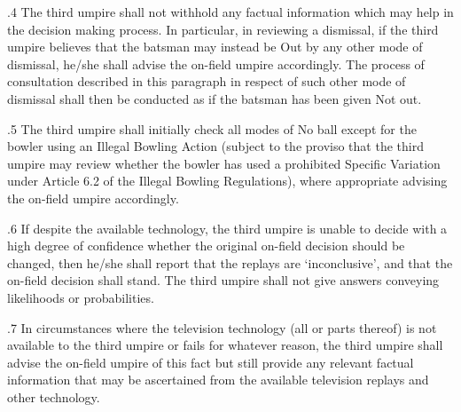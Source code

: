 \documentclass[12pt]{article}
\begin{document}
\vspace{\baselineskip}

\vspace{\baselineskip}
\begin{adjustwidth}{0.5in}{0.15in}
{\fontsize{9pt}{10.8pt}.4 \tabto{0.49in} The third umpire shall not withhold any factual information which may help in the decision making process. In particular, in reviewing a dismissal, if the third umpire believes that the batsman may instead be Out by any other mode of dismissal, he/she shall advise the on-field umpire accordingly. The process of consultation described in this paragraph in respect of such other mode of dismissal shall then be conducted as if the batsman has been given Not out.\par}\par

\end{adjustwidth}


\vspace{\baselineskip}
\begin{adjustwidth}{0.5in}{0.26in}
{\fontsize{9pt}{10.8pt}.5 \tabto{0.49in} The third umpire shall initially check all modes of No ball except for the bowler using an Illegal Bowling Action (subject to the proviso that the third umpire may review whether the bowler has used a prohibited Specific Variation under Article 6.2 of the Illegal Bowling Regulations), where appropriate advising the on-field umpire accordingly.\par}\par

\end{adjustwidth}


\vspace{\baselineskip}
\begin{adjustwidth}{0.5in}{0.21in}
{\fontsize{9pt}{10.8pt}.6 \tabto{0.49in} If despite the available technology, the third umpire is unable to decide with a high degree of confidence whether the original on-field decision should be changed, then he/she shall report that the replays are ‘inconclusive’, and that the on-field decision shall stand. The third umpire shall not give answers conveying likelihoods or probabilities.\par}\par

\end{adjustwidth}


\vspace{\baselineskip}
\begin{adjustwidth}{0.5in}{0.19in}
{\fontsize{9pt}{10.8pt}.7 \tabto{0.49in} In circumstances where the television technology (all or parts thereof) is not available to the third umpire or fails for whatever reason, the third umpire shall advise the on-field umpire of this fact but still provide any relevant factual information that may be ascertained from the available television replays and other technology.\par}\par

\end{adjustwidth}
\end{document}
